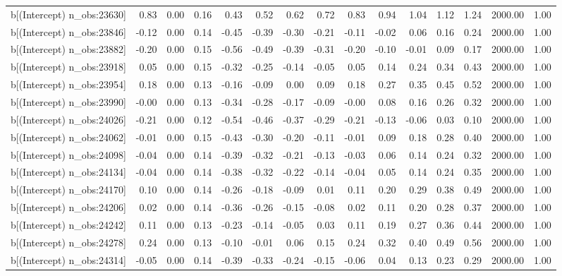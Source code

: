 \begin{table}[ht]
\begin{tabular}{rrrrrrrrrrrrrrr}
  b[(Intercept) n\_obs:23630] & 0.83 & 0.00 & 0.16 & 0.43 & 0.52 & 0.62 & 0.72 & 0.83 & 0.94 & 1.04 & 1.12 & 1.24 & 2000.00 & 1.00 \\ 
  b[(Intercept) n\_obs:23846] & -0.12 & 0.00 & 0.14 & -0.45 & -0.39 & -0.30 & -0.21 & -0.11 & -0.02 & 0.06 & 0.16 & 0.24 & 2000.00 & 1.00 \\ 
  b[(Intercept) n\_obs:23882] & -0.20 & 0.00 & 0.15 & -0.56 & -0.49 & -0.39 & -0.31 & -0.20 & -0.10 & -0.01 & 0.09 & 0.17 & 2000.00 & 1.00 \\ 
  b[(Intercept) n\_obs:23918] & 0.05 & 0.00 & 0.15 & -0.32 & -0.25 & -0.14 & -0.05 & 0.05 & 0.14 & 0.24 & 0.34 & 0.43 & 2000.00 & 1.00 \\ 
  b[(Intercept) n\_obs:23954] & 0.18 & 0.00 & 0.13 & -0.16 & -0.09 & 0.00 & 0.09 & 0.18 & 0.27 & 0.35 & 0.45 & 0.52 & 2000.00 & 1.00 \\ 
  b[(Intercept) n\_obs:23990] & -0.00 & 0.00 & 0.13 & -0.34 & -0.28 & -0.17 & -0.09 & -0.00 & 0.08 & 0.16 & 0.26 & 0.32 & 2000.00 & 1.00 \\ 
  b[(Intercept) n\_obs:24026] & -0.21 & 0.00 & 0.12 & -0.54 & -0.46 & -0.37 & -0.29 & -0.21 & -0.13 & -0.06 & 0.03 & 0.10 & 2000.00 & 1.00 \\ 
  b[(Intercept) n\_obs:24062] & -0.01 & 0.00 & 0.15 & -0.43 & -0.30 & -0.20 & -0.11 & -0.01 & 0.09 & 0.18 & 0.28 & 0.40 & 2000.00 & 1.00 \\ 
  b[(Intercept) n\_obs:24098] & -0.04 & 0.00 & 0.14 & -0.39 & -0.32 & -0.21 & -0.13 & -0.03 & 0.06 & 0.14 & 0.24 & 0.32 & 2000.00 & 1.00 \\ 
  b[(Intercept) n\_obs:24134] & -0.04 & 0.00 & 0.14 & -0.38 & -0.32 & -0.22 & -0.14 & -0.04 & 0.05 & 0.14 & 0.24 & 0.35 & 2000.00 & 1.00 \\ 
  b[(Intercept) n\_obs:24170] & 0.10 & 0.00 & 0.14 & -0.26 & -0.18 & -0.09 & 0.01 & 0.11 & 0.20 & 0.29 & 0.38 & 0.49 & 2000.00 & 1.00 \\ 
  b[(Intercept) n\_obs:24206] & 0.02 & 0.00 & 0.14 & -0.36 & -0.26 & -0.15 & -0.08 & 0.02 & 0.11 & 0.20 & 0.28 & 0.37 & 2000.00 & 1.00 \\ 
  b[(Intercept) n\_obs:24242] & 0.11 & 0.00 & 0.13 & -0.23 & -0.14 & -0.05 & 0.03 & 0.11 & 0.19 & 0.27 & 0.36 & 0.44 & 2000.00 & 1.00 \\ 
  b[(Intercept) n\_obs:24278] & 0.24 & 0.00 & 0.13 & -0.10 & -0.01 & 0.06 & 0.15 & 0.24 & 0.32 & 0.40 & 0.49 & 0.56 & 2000.00 & 1.00 \\ 
  b[(Intercept) n\_obs:24314] & -0.05 & 0.00 & 0.14 & -0.39 & -0.33 & -0.24 & -0.15 & -0.06 & 0.04 & 0.13 & 0.23 & 0.29 & 2000.00 & 1.00 \\ 

\end{tabular}
\end{table}
